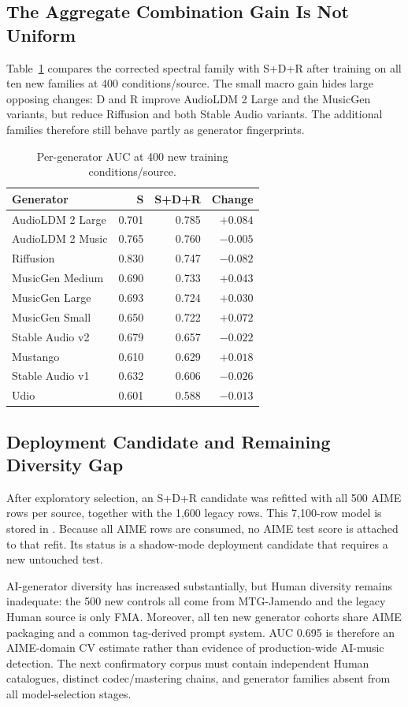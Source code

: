 \subsection{The Aggregate Combination Gain Is Not Uniform}

Table~\ref{tab:four-family-generator} compares the corrected spectral family
with S+D+R after training on all ten new families at 400 conditions/source.
The small macro gain hides large opposing changes: D and R improve AudioLDM 2
Large and the MusicGen variants, but reduce Riffusion and both Stable Audio
variants.  The additional families therefore still behave partly as generator
fingerprints.

\begin{table}[H]
\centering
\small
\caption{Per-generator AUC at 400 new training conditions/source.}
\label{tab:four-family-generator}
\begin{tabular}{lrrr}
\toprule
Generator & S & S+D+R & Change \\
\midrule
AudioLDM 2 Large & 0.701 & 0.785 & $+0.084$ \\
AudioLDM 2 Music & 0.765 & 0.760 & $-0.005$ \\
Riffusion & 0.830 & 0.747 & $-0.082$ \\
MusicGen Medium & 0.690 & 0.733 & $+0.043$ \\
MusicGen Large & 0.693 & 0.724 & $+0.030$ \\
MusicGen Small & 0.650 & 0.722 & $+0.072$ \\
Stable Audio v2 & 0.679 & 0.657 & $-0.022$ \\
Mustango & 0.610 & 0.629 & $+0.018$ \\
Stable Audio v1 & 0.632 & 0.606 & $-0.026$ \\
Udio & 0.601 & 0.588 & $-0.013$ \\
\bottomrule
\end{tabular}
\end{table}

\subsection{Deployment Candidate and Remaining Diversity Gap}

After exploratory selection, an S+D+R candidate was refitted with all 500 AIME
rows per source, together with the 1,600 legacy rows.  This 7,100-row model is
stored in .  Because all AIME rows are consumed, no AIME test
score is attached to that refit.  Its status is a shadow-mode deployment
candidate that requires a new untouched test.

AI-generator diversity has increased substantially, but Human diversity remains
inadequate: the 500 new controls all come from MTG-Jamendo and the legacy Human
source is only FMA.  Moreover, all ten new generator cohorts share AIME
packaging and a common tag-derived prompt system.  AUC 0.695 is therefore an
AIME-domain CV estimate rather than evidence of production-wide AI-music
detection.  The next confirmatory corpus must contain independent Human
catalogues, distinct codec/mastering chains, and generator families absent from
all model-selection stages.

